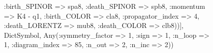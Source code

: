 \documentclass{revtex4}
\begin{document}
\begin{figure}[!htb]
\begin{center}
{:birth_SPINOR => spa8, :death_SPINOR => spb8, :momentum => K4 - q1, :birth_COLOR => cla8, :propagator_index => 4, :death_LORENTZ => mub8, :death_COLOR => clb8))], Dict{Symbol, Any}(:symmetry_factor => 1, :sign => 1, :n_loop => 1, :diagram_index => 85, :n_out => 2, :n_inc => 2)) 
}
\end{center}
\end{figure}
\end{document}

